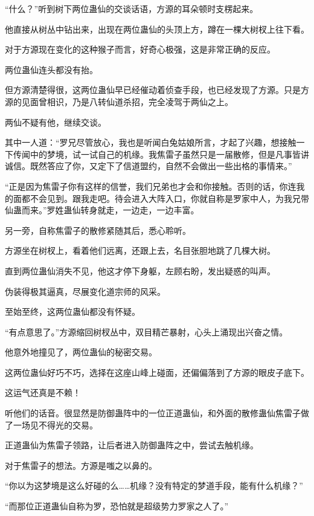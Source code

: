 
\begin{this_body}

“什么？”听到树下两位蛊仙的交谈话语，方源的耳朵顿时支楞起来。

他直接从树丛中钻出来，出现在两位蛊仙的头顶上方，蹲在一棵大树杈上往下看。

对于方源现在变化的这种猴子而言，好奇心极强，这是非常正确的反应。

两位蛊仙连头都没有抬。

但方源清楚得很，这两位蛊仙早已经催动着侦查手段，也已经发现了方源。只是方源的见面曾相识，乃是八转仙道杀招，完全凌驾于两仙之上。

两仙不疑有他，继续交谈。

其中一人道：“罗兄尽管放心，我也是听闻白兔姑娘所言，才起了兴趣，想接触一下传闻中的梦境，试一试自己的机缘。我焦雷子虽然只是一届散修，但是凡事皆讲诚信。既然答应了你，又定下了信道盟约，自然不会做出一些出格的事情来。”

“正是因为焦雷子你有这样的信誉，我们兄弟也才会和你接触。否则的话，你连我的面都不会见到。跟我走吧。待会进入大阵入口，你就自称是罗家中人，为我兄带仙蛊而来。”罗姓蛊仙转身就走，一边走，一边丰富。

另一旁，自称焦雷子的散修紧随其后，悉心聆听。

方源坐在树杈上，看着他们远离，还跟上去，名目张胆地跳了几棵大树。

直到两位蛊仙消失不见，他这才停下身躯，左顾右盼，发出疑惑的叫声。

伪装得极其逼真，尽展变化道宗师的风采。

至始至终，这两位蛊仙都没有怀疑。

“有点意思了。”方源缩回树杈丛中，双目精芒暴射，心头上涌现出兴奋之情。

他意外地撞见了，两位蛊仙的秘密交易。

这两位蛊仙好巧不巧，选择在这座山峰上碰面，还偏偏落到了方源的眼皮子底下。

这运气还真是不赖！

听他们的话音。很显然是防御蛊阵中的一位正道蛊仙，和外面的散修蛊仙焦雷子做了一场见不得光的交易。

正道蛊仙为焦雷子领路，让后者进入防御蛊阵之中，尝试去触机缘。

对于焦雷子的想法。方源是嗤之以鼻的。

“你以为这梦境是这么好碰的么……机缘？没有特定的梦道手段，能有什么机缘？”

“而那位正道蛊仙自称为罗，恐怕就是超级势力罗家之人了。”


\end{this_body}
